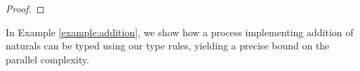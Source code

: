 \begin{lemma}
\begin{proof}
%
%
\end{proof}
\end{lemma}

In Example \ref{example:addition}, we show how a process implementing addition of naturals can be typed using our type rules, yielding a precise bound on the parallel complexity.
%

